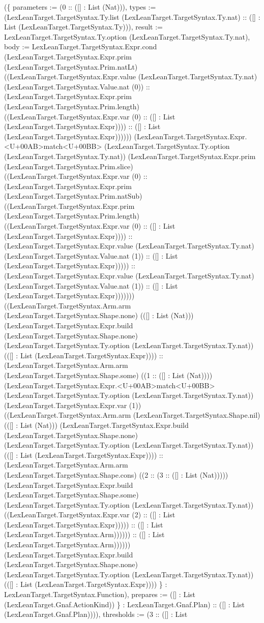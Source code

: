 \documentclass[11pt]{article}
\begin{document}
(\{ parameters := (0 :: ([] : List (Nat))), types := (LexLeanTarget.TargetSyntax.Ty.list (LexLeanTarget.TargetSyntax.Ty.nat) :: ([] : List (LexLeanTarget.TargetSyntax.Ty))), result := LexLeanTarget.TargetSyntax.Ty.option (LexLeanTarget.TargetSyntax.Ty.nat), body := LexLeanTarget.TargetSyntax.Expr.cond (LexLeanTarget.TargetSyntax.Expr.prim (LexLeanTarget.TargetSyntax.Prim.natLt) ((LexLeanTarget.TargetSyntax.Expr.value (LexLeanTarget.TargetSyntax.Ty.nat) (LexLeanTarget.TargetSyntax.Value.nat (0)) :: (LexLeanTarget.TargetSyntax.Expr.prim (LexLeanTarget.TargetSyntax.Prim.length) ((LexLeanTarget.TargetSyntax.Expr.var (0) :: ([] : List (LexLeanTarget.TargetSyntax.Expr)))) :: ([] : List (LexLeanTarget.TargetSyntax.Expr)))))) (LexLeanTarget.TargetSyntax.Expr.<U+00AB>match<U+00BB> (LexLeanTarget.TargetSyntax.Ty.option (LexLeanTarget.TargetSyntax.Ty.nat)) (LexLeanTarget.TargetSyntax.Expr.prim (LexLeanTarget.TargetSyntax.Prim.slice) ((LexLeanTarget.TargetSyntax.Expr.var (0) :: (LexLeanTarget.TargetSyntax.Expr.prim (LexLeanTarget.TargetSyntax.Prim.natSub) ((LexLeanTarget.TargetSyntax.Expr.prim (LexLeanTarget.TargetSyntax.Prim.length) ((LexLeanTarget.TargetSyntax.Expr.var (0) :: ([] : List (LexLeanTarget.TargetSyntax.Expr)))) :: (LexLeanTarget.TargetSyntax.Expr.value (LexLeanTarget.TargetSyntax.Ty.nat) (LexLeanTarget.TargetSyntax.Value.nat (1)) :: ([] : List (LexLeanTarget.TargetSyntax.Expr))))) :: (LexLeanTarget.TargetSyntax.Expr.value (LexLeanTarget.TargetSyntax.Ty.nat) (LexLeanTarget.TargetSyntax.Value.nat (1)) :: ([] : List (LexLeanTarget.TargetSyntax.Expr))))))) ((LexLeanTarget.TargetSyntax.Arm.arm (LexLeanTarget.TargetSyntax.Shape.none) (([] : List (Nat))) (LexLeanTarget.TargetSyntax.Expr.build (LexLeanTarget.TargetSyntax.Shape.none) (LexLeanTarget.TargetSyntax.Ty.option (LexLeanTarget.TargetSyntax.Ty.nat)) (([] : List (LexLeanTarget.TargetSyntax.Expr)))) :: (LexLeanTarget.TargetSyntax.Arm.arm (LexLeanTarget.TargetSyntax.Shape.some) ((1 :: ([] : List (Nat)))) (LexLeanTarget.TargetSyntax.Expr.<U+00AB>match<U+00BB> (LexLeanTarget.TargetSyntax.Ty.option (LexLeanTarget.TargetSyntax.Ty.nat)) (LexLeanTarget.TargetSyntax.Expr.var (1)) ((LexLeanTarget.TargetSyntax.Arm.arm (LexLeanTarget.TargetSyntax.Shape.nil) (([] : List (Nat))) (LexLeanTarget.TargetSyntax.Expr.build (LexLeanTarget.TargetSyntax.Shape.none) (LexLeanTarget.TargetSyntax.Ty.option (LexLeanTarget.TargetSyntax.Ty.nat)) (([] : List (LexLeanTarget.TargetSyntax.Expr)))) :: (LexLeanTarget.TargetSyntax.Arm.arm (LexLeanTarget.TargetSyntax.Shape.cons) ((2 :: (3 :: ([] : List (Nat))))) (LexLeanTarget.TargetSyntax.Expr.build (LexLeanTarget.TargetSyntax.Shape.some) (LexLeanTarget.TargetSyntax.Ty.option (LexLeanTarget.TargetSyntax.Ty.nat)) ((LexLeanTarget.TargetSyntax.Expr.var (2) :: ([] : List (LexLeanTarget.TargetSyntax.Expr))))) :: ([] : List (LexLeanTarget.TargetSyntax.Arm)))))) :: ([] : List (LexLeanTarget.TargetSyntax.Arm)))))) (LexLeanTarget.TargetSyntax.Expr.build (LexLeanTarget.TargetSyntax.Shape.none) (LexLeanTarget.TargetSyntax.Ty.option (LexLeanTarget.TargetSyntax.Ty.nat)) (([] : List (LexLeanTarget.TargetSyntax.Expr)))) \} : LexLeanTarget.TargetSyntax.Function), prepares := ([] : List (LexLeanTarget.Gnaf.ActionKind)) \} : LexLeanTarget.Gnaf.Plan) :: ([] : List (LexLeanTarget.Gnaf.Plan)))), thresholds := (3 :: ([] : List 
\end{document}

